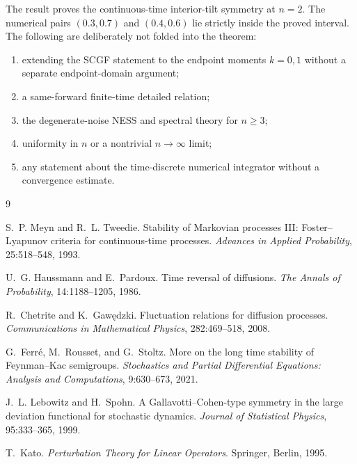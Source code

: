 \documentclass[11pt]{article}
\theoremstyle{remark}
\begin{document}
The result proves the continuous-time interior-tilt symmetry at $n=2$.
The numerical pairs $(0.3,0.7)$ and $(0.4,0.6)$ lie strictly inside the
proved interval.  The following are deliberately not folded into the
theorem:
\begin{enumerate}
\item extending the SCGF statement to the endpoint moments $k=0,1$ without
      a separate endpoint-domain argument;
\item a same-forward finite-time detailed relation;
\item the degenerate-noise NESS and spectral theory for $n\ge3$;
\item uniformity in $n$ or a nontrivial $n\to\infty$ limit;
\item any statement about the time-discrete numerical integrator without a
      convergence estimate.
\end{enumerate}

\begin{thebibliography}{9}

S.~P. Meyn and R.~L. Tweedie.
\newblock Stability of Markovian processes III: Foster--Lyapunov criteria for
continuous-time processes.
\newblock \emph{Advances in Applied Probability}, 25:518--548, 1993.

U.~G. Haussmann and E.~Pardoux.
\newblock Time reversal of diffusions.
\newblock \emph{The Annals of Probability}, 14:1188--1205, 1986.

R.~Chetrite and K.~Gaw\k{e}dzki.
\newblock Fluctuation relations for diffusion processes.
\newblock \emph{Communications in Mathematical Physics}, 282:469--518, 2008.

G.~Ferr\'e, M.~Rousset, and G.~Stoltz.
\newblock More on the long time stability of Feynman--Kac semigroups.
\newblock \emph{Stochastics and Partial Differential Equations: Analysis and
Computations}, 9:630--673, 2021.

J.~L. Lebowitz and H.~Spohn.
\newblock A Gallavotti--Cohen-type symmetry in the large deviation functional
for stochastic dynamics.
\newblock \emph{Journal of Statistical Physics}, 95:333--365, 1999.

T.~Kato.
\newblock \emph{Perturbation Theory for Linear Operators}.
\newblock Springer, Berlin, 1995.

\end{thebibliography}
\end{document}
